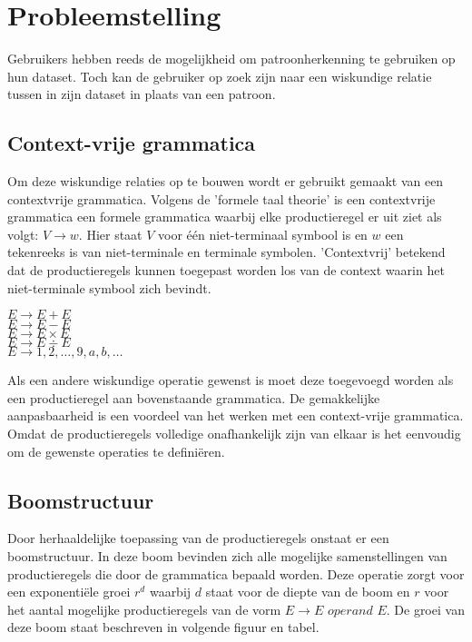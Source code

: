 \documentclass[Main.tex]{subfiles}
\begin{document}
\section{Probleemstelling}
Gebruikers hebben reeds de mogelijkheid om patroonherkenning te gebruiken op hun dataset. Toch kan de gebruiker op zoek zijn naar een wiskundige relatie tussen in zijn dataset in plaats van een patroon.
\subsection{Context-vrije grammatica}
Om deze wiskundige relaties op te bouwen wordt er gebruikt gemaakt van een contextvrije grammatica. Volgens de 'formele taal theorie' is een contextvrije grammatica een formele grammatica waarbij elke productieregel er uit ziet als volgt: $V \rightarrow w$. Hier staat $V$  voor \'e\'en niet-terminaal symbool is en $w$ een tekenreeks is van niet-terminale en terminale symbolen. 'Contextvrij' betekend dat de productieregels kunnen toegepast worden los van de context waarin het niet-terminale symbool zich bevindt. \\

\begin{framed}
\begin{center}
$E \rightarrow E + E$ \\
$E \rightarrow E - E$  \\
$E \rightarrow E \times E$ \\
$E \rightarrow E \div E$ \\
$E \rightarrow 1,2,\dotsc,9,a,b,\dotsc$
\end{center}
\end{framed}

Als een andere wiskundige operatie gewenst is moet deze toegevoegd worden als een productieregel aan bovenstaande grammatica. De gemakkelijke aanpasbaarheid is een voordeel van het werken met een context-vrije grammatica. Omdat de productieregels volledige onafhankelijk zijn van elkaar is het eenvoudig om de gewenste operaties te defini\"eren.

\subsection{Boomstructuur}

Door herhaaldelijke toepassing van de productieregels onstaat er een boomstructuur. In deze boom bevinden zich alle mogelijke samenstellingen van productieregels die door de grammatica bepaald worden. Deze operatie zorgt voor een exponenti\"ele groei $r^{d}$ waarbij $d$ staat voor de diepte van de boom en $r$ voor het aantal mogelijke productieregels van de vorm $E \rightarrow E$  $operand$ $ E$. De groei van deze boom staat beschreven in volgende figuur en tabel.
\end{document}
